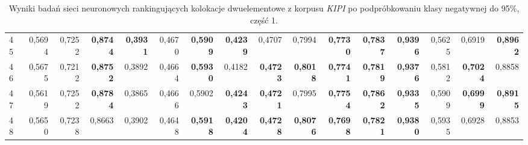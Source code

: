 \begin{table}[htp!]
\begin{adjustwidth}{-2cm}{}
\begin{tabular}{ l | *{15}{| r}}
45	&	0,5694	&	0,7252	&	\textbf{0,8744}	&	\textbf{0,3931}	&	0,4670	&	\textbf{0,5909}	&	\textbf{0,4239}	&	0,4707	&	0,7994	&	\textbf{0,7730}	&	\textbf{0,7837}	&	\textbf{0,9396}	&	0,5625	&	0,6919	&	\textbf{0,8962}	\\
46	&	0,5675	&	0,7212	&	\textbf{0,8752}	&	0,3892	&	0,4664	&	\textbf{0,5930}	&	0,4182	&	\textbf{0,4723}	&	\textbf{0,8018}	&	\textbf{0,7741}	&	\textbf{0,7819}	&	\textbf{0,9376}	&	0,5812	&	\textbf{0,7024}	&	0,8858	\\
47	&	0,5619	&	0,7252	&	\textbf{0,8784}	&	0,3865	&	0,4666	&	0,5902	&	\textbf{0,4243}	&	\textbf{0,4721}	&	0,7995	&	\textbf{0,7754}	&	\textbf{0,7862}	&	\textbf{0,9335}	&	0,5909	&	\textbf{0,6999}	&	\textbf{0,8915}	\\
48	&	0,5650	&	0,7238	&	0,8663	&	0,3902	&	0,4648	&	\textbf{0,5918}	&	\textbf{0,4204}	&	\textbf{0,4728}	&	\textbf{0,8076}	&	\textbf{0,7698}	&	\textbf{0,7821}	&	\textbf{0,9380}	&	0,5935	&	0,6928	&	0,8853	\\
	\bottomrule
\end{tabular}
 \end{adjustwidth}
\caption[Wyniki badań sieci neuronowych rankingujących kolokacje dwuelementowe z korpusu \emph{KIPI} po podpróbkowaniu klasy negatywnej do 95\%, część 1]{Wyniki badań sieci neuronowych rankingujących kolokacje dwuelementowe z korpusu \emph{KIPI} po podpróbkowaniu klasy negatywnej do 95\%, część 1.}
\label{KIPI_sub5_nn_part_1}
\end{table}

